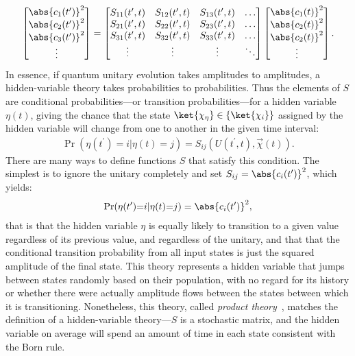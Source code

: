 \begin{align}
\left[\begin{matrix}
\abs{c_1(t^\prime)}^2\\\abs{c_2(t^\prime)}^2\\\abs{c_3(t^\prime)}^2\\\vdots
\end{matrix}\right]
= \left[\begin{matrix}
S_{11}(t^\prime, t) & S_{12}(t^\prime, t) & S_{13}(t^\prime, t)&\hdots\\
S_{21}(t^\prime, t) & S_{22}(t^\prime, t) & S_{23}(t^\prime, t)&\hdots\\
S_{31}(t^\prime, t) & S_{32}(t^\prime, t) & S_{33}(t^\prime, t)&\hdots\\
\vdots & \vdots & \vdots & \ddots
\end{matrix}\right]
\left[\begin{matrix}
\abs{c_1(t)}^2\\\abs{c_2(t)}^2\\\abs{c_2(t)}^2\\\vdots
\end{matrix}\right].
\end{align}
In essence, if quantum unitary evolution takes amplitudes to amplitudes, a hidden-variable theory takes probabilities to probabilities. Thus the elements of $S$ are conditional probabilities---or transition probabilities---for a hidden variable $\eta(t)$, giving the chance that the state $\ket{\chi_\eta} \in \{\ket{\chi_i}\}$ assigned by the hidden variable will change from one to another in the given time interval:
\begin{align}\label{eq:conditional_probability}
\Pr(\eta(t^\prime){=}i|\eta(t){=}j) = S_{ij}(U(t^\prime, t), \vec\chi(t)).
\end{align}
There are many ways to define functions $S$ that satisfy this condition. The simplest is to ignore the unitary completely and set $S_{ij} = \abs{c_i(t^\prime)}^2$, which yields:
\begin{align}
\Pr(\eta(t^\prime){=}i|\eta(t){=}j) = \abs{c_{i}(t^\prime)}^2,
\end{align}
that is that the hidden variable $\eta$ is equally likely to transition to a given value regardless of its previous value, and regardless of the unitary, and that that the conditional transition probability from all input states is just the squared amplitude of the final state. This theory represents a hidden variable that jumps between states randomly based on their population, with no regard for its history or whether there were actually amplitude flows between the states between which it is transitioning. Nonetheless, this theory, called \emph{product theory}~\cite{PhysRevA.71.032325}, matches the definition of a hidden-variable theory---$S$ is a stochastic matrix, and the hidden variable on average will spend an amount of time in each state consistent with the Born rule.

